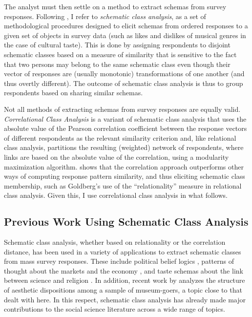 \documentclass[preprint, authoryear,11pt, 3p]{elsarticle}
\begin{document}
The analyst must then settle on a method to extract schemas from survey responses. Following \citep{boutyline2017improving}, I refer to \emph{schematic class analysis}, as a set of methodological procedures designed to elicit schemas from ordered responses to a given set of objects in survey data (such as likes and dislikes of musical genres in the case of cultural taste). This is done by assigning respondents to disjoint schematic classes based on a measure of similarity that is sensitive to the fact that two persons may belong to the same schematic class even though their vector of responses are (usually monotonic) transformations of one another (and thus overtly different). The outcome of schematic class analysis is thus to group respondents based on sharing similar schemas. 

Not all methods of extracting schemas from survey responses are equally valid. {\em Correlational Class Analysis} is a variant of schematic class analysis that uses the absolute value of the Pearson correlation coefficient between the response vectors of different respondents as the relevant similarity criterion and, like relational class analysis, partitions the resulting (weighted) network of respondents, where links are based on the absolute value of the correlation, using a modularity maximization algorithm. \citet{boutyline2017improving} shows that the correlation approach outperforms other ways of computing response pattern similarity, and thus eliciting schematic class membership, such as Goldberg's \citeyear{goldberg2011mapping} use of the ``relationality'' measure in relational class analysis. Given this, I use correlational class analysis in what follows.  

\subsection{Previous Work Using Schematic Class Analysis}
Schematic class analysis, whether based on relationality or the correlation distance, has been used in a variety of applications to extract schematic classes from mass survey responses. These include political belief logics \citep{baldassarri2014neither, daenekindt2017people}, patterns of thought about the markets and the economy \citep{dimaggio2018searching, metzmcDonnell2018multiple}, and taste schemas about the link between science and religion \citep{dimaggio2017culture}. In addition, recent work by \citet{daenekindt2017structure} analyzes the structure of aesthetic dispositions among a sample of museum-goers, a topic close to that dealt with here. In this respect, schematic class analysis has already made major contributions to the social science literature across a wide range of topics. 
\end{document}
